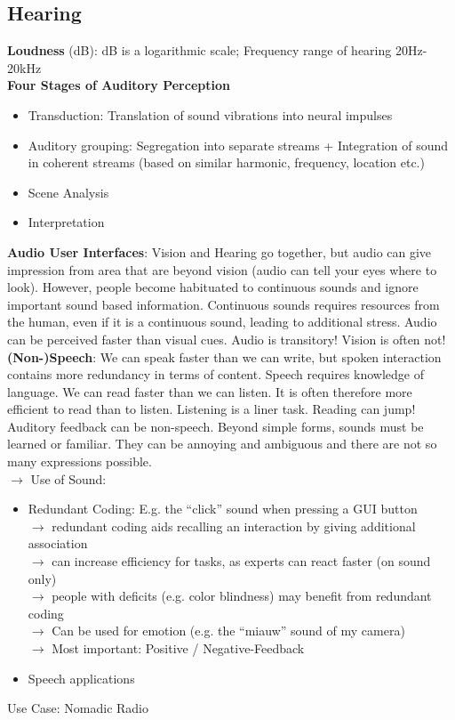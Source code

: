 \subsection{Hearing}
\textbf{Loudness} (dB): dB is a logarithmic scale; Frequency range of hearing 20Hz-20kHz\\
\textbf{Four Stages of Auditory Perception}
\begin{itemize}
\item Transduction: Translation of sound vibrations into neural impulses
\item Auditory grouping: Segregation into separate streams + Integration of sound in coherent streams (based on similar harmonic, frequency, location etc.)
\item Scene Analysis
\item Interpretation
\end{itemize}
\textbf{Audio User Interfaces}: Vision and Hearing go together, but audio can give impression from area that are beyond vision (audio can tell your eyes where to look). However, people become habituated to continuous sounds and ignore important sound based information. Continuous sounds requires resources from the human, even if it is a continuous sound, leading to additional stress. Audio can be perceived faster than visual cues. Audio is transitory! Vision is often not!\\
\textbf{(Non-)Speech}: We can speak faster than we can write, but spoken interaction contains more redundancy in terms of content. Speech requires knowledge of language. We can read faster than we can listen. It is often therefore more efficient to read than to listen. Listening is a liner task. Reading can jump! Auditory feedback can be non-speech. Beyond simple forms, sounds must be learned or familiar. They can be annoying and ambiguous and there are not so many expressions possible.\\
$\rightarrow$ Use of Sound:
\begin{itemize}
\item Redundant Coding: E.g. the ``click'' sound when pressing a GUI button\\
$\rightarrow$ redundant coding aids recalling an interaction by giving additional association\\
$\rightarrow$ can increase efficiency for tasks, as experts can react faster (on sound only)\\
$\rightarrow$ people with deficits (e.g. color blindness) may benefit from redundant coding\\
$\rightarrow$ Can be used for emotion (e.g. the ``miauw'' sound of my camera)\\
$\rightarrow$ Most important: Positive / Negative-Feedback
\item Speech applications
\end{itemize}
Use Case: Nomadic Radio	